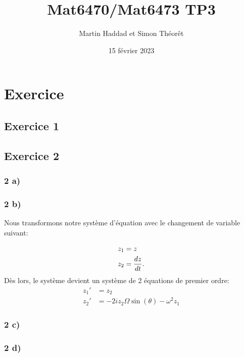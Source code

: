 \documentclass{article}
\title{Mat6470/Mat6473 TP3}
\author{Martin Haddad et Simon Théorêt }
\date{15 février 2023}
\begin{document}
\maketitle
\section*{Exercice}
\subsection*{Exercice 1}

\subsection*{Exercice 2}
\subsubsection*{2 a)}
\subsubsection*{2 b)}
Nous transformons notre système d'équation avec le changement de variable
suivant:

\begin{align*}
    z_1 &= z\\
    z_2 &= \frac{d z}{d t}.
\end{align*}
Dès lors, le système devient un système de 2 équations de premier ordre:
\begin{align*}
    z_1' &= z_2\\
    z_2' &= -2i z_2 \Omega \sin (\theta) -\omega^2 z_1
\end{align*}
\subsubsection*{2 c)}
\subsubsection*{2 d)}
\end{document}
